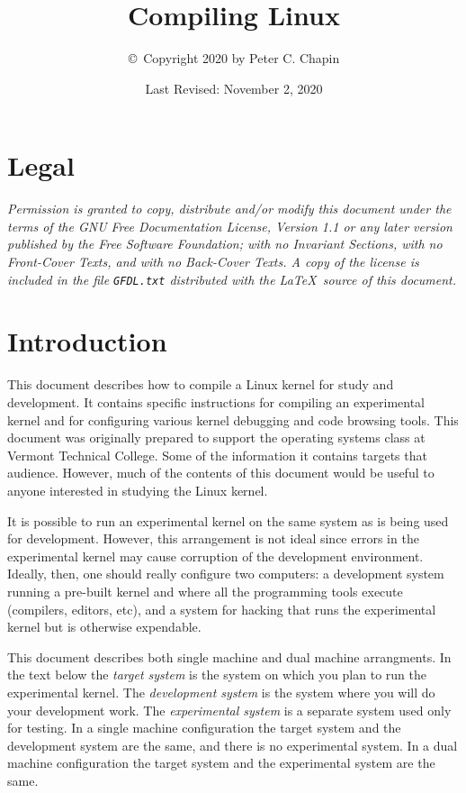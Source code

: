 \documentclass{article}
\newcommand{\newterm}[1]{\textit{#1}}
\begin{document}
\title{Compiling Linux}
\author{\copyright\ Copyright 2020 by Peter C. Chapin}
\date{Last Revised: November 2, 2020}
\maketitle

\tableofcontents
\newpage
{}

\section*{Legal}
\label{sec:legal}

\textit{Permission is granted to copy, distribute and/or modify this document under the terms of
  the GNU Free Documentation License, Version 1.1 or any later version published by the Free
  Software Foundation; with no Invariant Sections, with no Front-Cover Texts, and with no
  Back-Cover Texts. A copy of the license is included in the file \texttt{GFDL.txt} distributed
  with the \LaTeX\ source of this document.}

\section{Introduction}

This document describes how to compile a Linux kernel for study and development. It contains
specific instructions for compiling an experimental kernel and for configuring various kernel
debugging and code browsing tools. This document was originally prepared to support the
operating systems class at Vermont Technical College. Some of the information it contains
targets that audience. However, much of the contents of this document would be useful to anyone
interested in studying the Linux kernel.

It is possible to run an experimental kernel on the same system as is being used for
development. However, this arrangement is not ideal since errors in the experimental kernel may
cause corruption of the development environment. Ideally, then, one should really configure two
computers: a development system running a pre-built kernel and where all the programming tools
execute (compilers, editors, etc), and a system for hacking that runs the experimental kernel
but is otherwise expendable.

This document describes both single machine and dual machine arrangments. In the text below the
\newterm{target system} is the system on which you plan to run the experimental kernel. The
\newterm{development system} is the system where you will do your development work. The
\newterm{experimental system} is a separate system used only for testing. In a single machine
configuration the target system and the development system are the same, and there is no
experimental system. In a dual machine configuration the target system and the experimental
system are the same.
\end{document}
